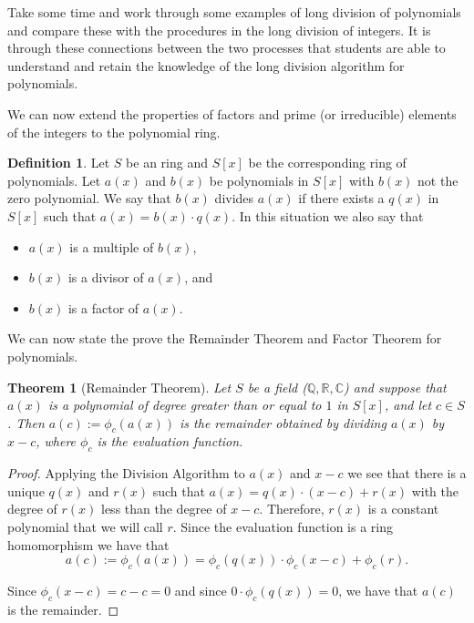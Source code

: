\documentclass[
]{book}
\providecommand{\tightlist}{%
  \setlength{\itemsep}{0pt}\setlength{\parskip}{0pt}}
\newtheorem{theorem}{Theorem}[chapter]
\theoremstyle{definition}
\newtheorem{definition}{Definition}[chapter]
\theoremstyle{definition}
\theoremstyle{definition}
\theoremstyle{remark}
\begin{document}
Take some time and work through some examples of long division of polynomials and compare these with the procedures in the long division of integers. It is through these connections between the two processes that students are able to understand and retain the knowledge of the long division algorithm for polynomials.

We can now extend the properties of factors and prime (or irreducible) elements of the integers to the polynomial ring.

\begin{definition}
\protect\hypertarget{def:unnamed-chunk-196}{}{\label{def:unnamed-chunk-196} }Let \(S\) be an ring and \(S[x]\) be the corresponding ring of polynomials. Let \(a(x)\) and \(b(x)\) be polynomials in \(S[x]\) with \(b(x)\) not the zero polynomial. We say that \(b(x)\) divides \(a(x)\) if there exists a \(q(x)\) in \(S[x]\) such that \(a(x)=b(x)\cdot q(x)\). In this situation we also say that

\begin{itemize}
\tightlist
\item
  \(a(x)\) is a multiple of \(b(x)\),
\item
  \(b(x)\) is a divisor of \(a(x)\), and
\item
  \(b(x)\) is a factor of \(a(x)\).
\end{itemize}
\end{definition}

We can now state the prove the Remainder Theorem and Factor Theorem for polynomials.

\begin{theorem}[Remainder Theorem]
\protect\hypertarget{thm:unnamed-chunk-197}{}{\label{thm:unnamed-chunk-197} {} }Let \(S\) be a field (\(\mathbb{Q}, \mathbb{R}, \mathbb{C}\)) and suppose that \(a(x)\) is a polynomial of degree greater than or equal to \(1\) in \(S[x]\), and let \(c\in S\). Then \(a(c):=\phi_c(a(x))\) is the remainder obtained by dividing \(a(x)\) by \(x-c\), where \(\phi_c\) is the evaluation function.
\end{theorem}

\begin{proof}
{}Applying the Division Algorithm to \(a(x)\) and \(x-c\) we see that there is a unique \(q(x)\) and \(r(x)\) such that \(a(x)=q(x)\cdot (x-c)+r(x)\) with the degree of \(r(x)\) less than the degree of \(x-c\). Therefore, \(r(x)\) is a constant polynomial that we will call \(r\). Since the evaluation function is a ring homomorphism we have that \[a(c):= \phi_c(a(x))=\phi_c(q(x))\cdot \phi_c(x-c) + \phi_c(r).\]

Since \(\phi_c(x-c)=c-c=0\) and since \(0\cdot \phi_c(q(x))=0\), we have that \(a(c)\) is the remainder.
\end{proof}
\end{document}

